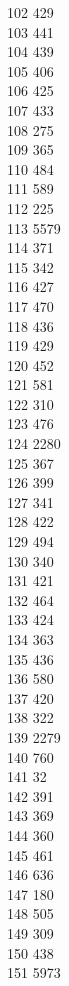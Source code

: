 { 102	429 \\
 103	441 \\
 104	439 \\
 105	406 \\
 106	425 \\
 107	433 \\
 108	275 \\
 109	365 \\
 110	484 \\
 111	589 \\
 112	225 \\
 113	5579 \\
 114	371 \\
 115	342 \\
 116	427 \\
 117	470 \\
 118	436 \\
 119	429 \\
 120	452 \\
 121	581 \\
 122	310 \\
 123	476 \\
 124	2280 \\
 125	367 \\
 126	399 \\
 127	341 \\
 128	422 \\
 129	494 \\
 130	340 \\
 131	421 \\
 132	464 \\
 133	424 \\
 134	363 \\
 135	436 \\
 136	580 \\
 137	420 \\
 138	322 \\
 139	2279 \\
 140	760 \\
 141	32 \\
 142	391 \\
 143	369 \\
 144	360 \\
 145	461 \\
 146	636 \\
 147	180 \\
 148	505 \\
 149	309 \\
 150	438 \\
 151	5973 \\
}
